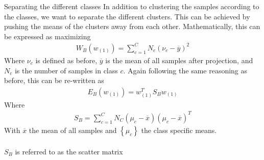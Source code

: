 \begin{parag}{Separating the different classes}
    In addition to clustering the samples according to the classes, we want to separate the different clusters. This can be achieved by pushing the means of the clusters away from each other. Mathematically, this can be expressed as maximizing 
	\begin{align*} 
		W_B\left(w_{\left(1\right)}\right) = \sum_{c= 1}^{C}N_c \left(\nu_c - \overline{y}\right)^2
	\end{align*}
	Where $\nu_c$ is defined as before, $\overline{y}$ is the mean of all samples after projection, and $N_c$ is the number of samples in class $c$. Again following the same reasoning as before, this can be re-written as 
	\begin{align*} 
		E_B\left(w_{\left(1\right)}\right) = w_{\left(1\right)}^{T}S_Bw_{\left(1\right)}
	\end{align*}
	Where 
	\begin{align*} 
		S_B = \sum_{c= 1}^{C}N_C\left(\mu_c - \overline{x}\right)\left(\mu_c - \overline{x}\right)^{T}
	\end{align*}
	With $\overline{x}$ the mean of all samples and $\left\{\mu_c\right\}$ the class specific means.\\
	$ $\\
	$S_B$ is referred to as the  scatter matrix
\end{parag}


